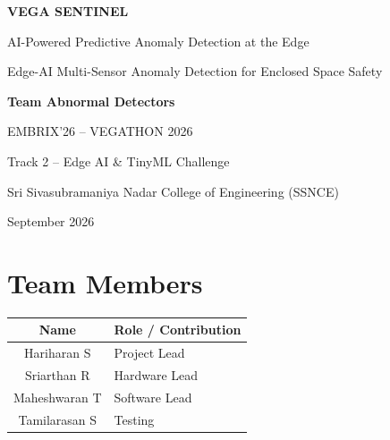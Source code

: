 \documentclass[11pt]{article}
\begin{document}
\begin{titlepage}
  \centering
  \vspace*{2cm}
  {\Huge\bfseries VEGA SENTINEL\par}
  \vspace{0.5cm}
  {\LARGE AI-Powered Predictive Anomaly Detection at the Edge\par}
  \vspace{1.2cm}
  {\large Edge-AI Multi-Sensor Anomaly Detection for Enclosed Space Safety\par}
  \vspace{1.5cm}
  {\large\bfseries Team Abnormal Detectors\par}
  \vspace{0.3cm}
  {\large EMBRIX'26 -- VEGATHON 2026\par}
  {\large Track 2 -- Edge AI \& TinyML Challenge\par}
  \vspace{0.8cm}
  {\large Sri Sivasubramaniya Nadar College of Engineering (SSNCE)\par}
  \vfill
  {\large September 2026\par}
  \vspace{1cm}
\end{titlepage}

\section{Team Members}

\begin{table}[ht]
\centering
\begin{tabular}{cl}
\toprule
\textbf{Name} & \textbf{Role / Contribution} \\
\midrule
Hariharan S   & Project Lead \\
Sriarthan R   & Hardware Lead \\
Maheshwaran T & Software Lead \\
Tamilarasan S & Testing \\
\bottomrule
\end{tabular}
\end{table}

\end{document}
